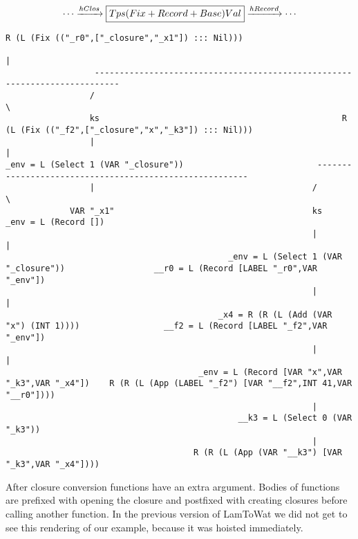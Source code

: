 \begin{landscape}
\begin{gather*}
  \cdots \xrightarrow{hClos} \boxed{Tps (Fix + Record + Base) Val} \xrightarrow{hRecord} \cdots
\end{gather*}
\begin{lstlisting}[basicstyle=\fontsize{9}{10}\selectfont\ttfamily]
                                                   R (L (Fix (("_r0",["_closure","_x1"]) ::: Nil)))
                                                                          |
                  ---------------------------------------------------------------------------
                 /                                                                           \
                 ks                                                 R (L (Fix (("_f2",["_closure","x","_k3"]) ::: Nil)))
                 |                                                                           |
_env = L (Select 1 (VAR "_closure"))                           --------------------------------------------------------
                 |                                            /                                                        \
             VAR "_x1"                                        ks                                              _env = L (Record [])
                                                              |                                                        |
                                             _env = L (Select 1 (VAR "_closure"))                  __r0 = L (Record [LABEL "_r0",VAR "_env"])
                                                              |                                                        |
                                           _x4 = R (R (L (Add (VAR "x") (INT 1))))                 __f2 = L (Record [LABEL "_f2",VAR "_env"])
                                                              |                                                        |
                                       _env = L (Record [VAR "x",VAR "_k3",VAR "_x4"])    R (R (L (App (LABEL "_f2") [VAR "__f2",INT 41,VAR "__r0"])))
                                                              |
                                               __k3 = L (Select 0 (VAR "_k3"))
                                                              |
                                      R (R (L (App (VAR "__k3") [VAR "_k3",VAR "_x4"])))

\end{lstlisting}
After closure conversion functions have an extra  argument. Bodies of functions are prefixed with opening the closure and postfixed with creating closures before calling another function. In the previous version of LamToWat we did not get to see this rendering of our example, because it was hoisted immediately.
\end{landscape}
\clearpage


